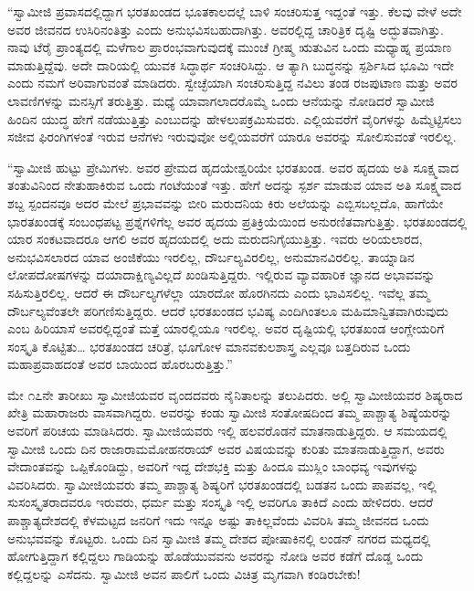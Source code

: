  “ಸ್ವಾಮೀಜಿ ಪ್ರವಾಸದಲ್ಲಿದ್ದಾಗ ಭರತಖಂಡದ ಭೂತಕಾಲದಲ್ಲೆ ಬಾಳಿ ಸಂಚರಿಸುತ್ತ ಇದ್ದಂತೆ ಇತ್ತು. ಕೆಲವು ವೇಳೆ ಅದೇ ಅವರ ಜೀವನದ ಉಸಿರಿನಂತಿತ್ತು ಎಂದು ಅನುಭವಿಸಬಹುದಾಗಿತ್ತು. ಅವರಲ್ಲಿದ್ದ ಚಾರಿತ್ರಿಕ ದೃಷ್ಟಿ ಅದ್ಭುತವಾಗಿತ್ತು. ನಾವು ಟೆರೈ ಪ್ರಾಂತ್ಯದಲ್ಲಿ ಮಳೆಗಾಲ ಪ್ರಾರಂಭವಾಗುವುದಕ್ಕೆ ಮುಂಚೆ ಗ್ರೀಷ್ಮ ಋತುವಿನ ಒಂದು ಮಧ್ಯಾಹ್ನ ಪ್ರಯಾಣ ಮಾಡುತ್ತಿದ್ದೆವು. ಅದೇ ದಾರಿಯಲ್ಲಿ ಯುವಕ ಸಿದ್ಧಾರ್ಥ ಸಂಚರಿಸಿದ್ದು. ಆ ತ್ಯಾಗಿ ಬುದ್ಧನನ್ನು ಸ್ಪರ್ಶಿಸಿದ ಭೂಮಿ ಇದೇ ಎಂದು ನಮಗೆ ಅರಿವಾಗುವಂತೆ ಮಾಡಿದರು. ಸ್ವೇಚ್ಛೆಯಾಗಿ ಸಂಚರಿಸುತ್ತಿದ್ದ ನವಿಲು ತಂಡ ರಜಪುಟಾಣ ಮತ್ತು ಅವರ ಲಾವಣಿಗಳನ್ನು ಮನಸ್ಸಿಗೆ ತರುತ್ತಿತ್ತು. ಮಧ್ಯೆ ಯಾವಾಗಲಾದರೊಮ್ಮೆ ಒಂದು ಆನೆಯನ್ನು ನೋಡಿದರೆ ಸ್ವಾಮೀಜಿ ಹಿಂದಿನ ಯುದ್ಧ ಹೇಗೆ ನಡೆಯುತ್ತಿತ್ತು ಎಂಬುದನ್ನು ಹೇಳಲುಪಕ್ರಮಿಸುವರು. ಎಲ್ಲಿಯವರೆಗೆ ವೈರಿಗಳನ್ನು ಹಿಮ್ಮೆಟ್ಟಿಸಲು ಸಜೀವ ಫಿರಂಗಿಗಳಂತೆ ಇರುವ ಆನೆಗಳು ಇರುವುವೋ ಅಲ್ಲಿಯವರೆಗೆ ಯಾರೂ ಅವರನ್ನು ಸೋಲಿಸುವಂತೆ ಇರಲಿಲ್ಲ. 

 “ಸ್ವಾಮೀಜಿ ಹುಟ್ಟು ಪ್ರೇಮಿಗಳು. ಅವರ ಪ್ರೇಮದ ಹೃದಯೇಶ್ವರಿಯೇ ಭರತಖಂಡ. ಅವರ ಹೃದಯ ಅತಿ ಸೂಕ್ಷ್ಮವಾದ ತಂತುವಿನಿಂದ ನೇತುಹಾಕಿರುವ ಒಂದು ಗಂಟೆಯಂತೆ ಇತ್ತು. ಹೇಗೆ ಅದನ್ನು ಸ್ಪರ್ಶ ಮಾಡುವ ಯಾವ ಅತಿ ಸೂಕ್ಷ್ಮವಾದ ಶಬ್ದ ಸ್ಪಂದನವೂ ಅದರ ಮೇಲೆ ಪ್ರಭಾವವನ್ನು ಬೀರಿ ಮರುದನಿಯ ಕಿರು ಅಲೆಯನ್ನು ಎಬ್ಬಿಸಬಲ್ಲದೊ, ಹಾಗೆಯೇ ಭಾರತಖಂಡಕ್ಕೆ ಸಂಬಂಧಪಟ್ಟ ಪ್ರಶ್ನೆಗಳಿಗೆಲ್ಲ ಅವರ ಹೃದಯ ಪ್ರತಿಕ್ರಿಯೆಯಿಂದ ಅನುರಣಿತವಾಗುತ್ತಿತ್ತು. ಭರತಖಂಡದಲ್ಲಿ ಯಾರ ಸಂಕಟವಾದರೂ ಆಗಲಿ ಅವರ ಹೃದಯದಲ್ಲಿ ಅದು ಮರುದನಿಗೈಯುತ್ತಿತ್ತು. ಇವರು ಅರಿಯಲಾರದ, ಅನುಭವಿಸಲಾರದ ಯಾವ ಅಂಜಿಕೆಯು ಇರಲಿಲ್ಲ, ದೌರ್ಬಲ್ಯವಿರಲಿಲ್ಲ, ಅನುಮಾನವಿರಲಿಲ್ಲ. ತಾಯ್ನಾಡಿನ ಲೋಪದೋಷಗಳನ್ನು ದಯಾದಾಕ್ಷಿಣ್ಯವಿಲ್ಲದೆ ಖಂಡಿಸುತ್ತಿದ್ದರು. ಇಲ್ಲಿರುವ ವ್ಯಾವಹಾರಿಕ ಜ್ಞಾನದ ಅಭಾವವನ್ನು ಸಹಿಸುತ್ತಿರಲಿಲ್ಲ. ಆದರೆ ಈ ದೌರ್ಬಲ್ಯಗಳೆಲ್ಲಾ ಯಾರದೋ ಹೊರಗಿನದು ಎಂದು ಭಾವಿಸಲಿಲ್ಲ. ಇವೆಲ್ಲ ತಮ್ಮ ದೌರ್ಬಲ್ಯವೆಂತಲೇ ಪರಿಗಣಿಸುತ್ತಿದ್ದರು. ಆದರೆ ಭರತಖಂಡದ ಭವಿಷ್ಯ ಎಂದಿಗಿಂತಲೂ ಮಹಿಮಾನ್ವಿತವಾಗಿರುವುದು ಎಂಬ ಹಿರಿಯಾಸೆ ಅವರಲ್ಲಿದ್ದಂತೆ ಮತ್ತೆ ಯಾರಲ್ಲಿಯೂ ಇರಲಿಲ್ಲ. ಅವರ ದೃಷ್ಟಿಯಲ್ಲಿ ಭರತಖಂಡ ಆಂಗ್ಲೇಯರಿಗೆ ಸಂಸ್ಕೃತಿ ಕೊಟ್ಟಿತು… ಭರತಖಂಡದ ಚರಿತ್ರೆ, ಭೂಗೋಳ ಮಾನವಕುಲಶಾಸ್ತ್ರ ಎಲ್ಲವೂ ಬತ್ತದಿರುವ ಒಂದು ಮಹಾಪ್ರವಾಹದಂತೆ ಅವರ ಬಾಯಿಂದ ಹೊರಬರುತ್ತಿತ್ತು.” 

 ಮೇ ೧೭ನೇ ತಾರೀಖು ಸ್ವಾಮೀಜಿಯವರ ವೃಂದದವರು ನೈನಿತಾಲನ್ನು ತಲುಪಿದರು. ಅಲ್ಲಿ ಸ್ವಾಮೀಜಿಯವರ ಶಿಷ್ಯರಾದ ಖೇತ್ರಿ ಮಹಾರಾಜರು ವಾಸವಾಗಿದ್ದರು. ಅವರನ್ನು ಕಂಡು ಸ್ವಾಮೀಜಿ ಸಂತೋಷದಿಂದ ತಮ್ಮ ಪಾಶ್ಚಾತ್ಯ ಶಿಷ್ಯೆಯರನ್ನು ಅವರಿಗೆ ಪರಿಚಯ ಮಾಡಿಸಿದರು. ಸ್ವಾಮೀಜಿಯವರು ಇಲ್ಲಿ ಹಲವರೊಡನೆ ಮಾತನಾಡು\-ತ್ತಿದ್ದರು. ಆ ಸಮಯದಲ್ಲಿ ಸ್ವಾಮೀಜಿ ಒಂದು ದಿನ ರಾಜಾರಾಮಮೋಹನರಾಯ್ ಅವರ ವಿಷಯವನ್ನು ಕುರಿತು ಮಾತನಾಡುತ್ತಿದ್ದಾಗ, ಅವರು ವೇದಾಂತವನ್ನು ಒಪ್ಪಿಕೊಂಡಿದ್ದು, ಅವರಿಗೆ ಇದ್ದ ದೇಶಭಕ್ತಿ ಮತ್ತು ಹಿಂದೂ ಮುಸ್ಲಿಂ ಬಾಂಧವ್ಯ ಇವುಗಳನ್ನು ವಿವರಿಸಿದರು. ಸ್ವಾಮೀಜಿಯವರು ತಮ್ಮ ಪಾಶ್ಚಾತ್ಯ ಶಿಷ್ಯರಿಗೆ ಭರತಖಂಡದಲ್ಲಿ ಬಡತನ ಒಂದು ಪಾಪವಲ್ಲ, ಇಲ್ಲಿ ಸುಸಂಸ್ಕೃತರಾದವರೂ ಇರುವರು, ಧರ್ಮ ಮತ್ತು ಸಂಸ್ಕೃತಿ ಇಲ್ಲಿ ಅವರಿಗೂ ತಾಕಿದೆ ಎಂದು ಹೇಳಿದರು. ಆದರೆ ಪಾಶ್ಚಾತ್ಯದೇಶದಲ್ಲಿ ಕೆಳಮಟ್ಟದ ಜನರಿಗೆ ಇದು ಇನ್ನೂ ಅಷ್ಟು ತಾಕಿಲ್ಲವೆಂದು ವಿವರಿಸಿ ತಮ್ಮ ಜೀವನದ ಒಂದು ಅನುಭವವನ್ನು ಕೊಟ್ಟರು. ಒಂದು ದಿನ ಸ್ವಾಮೀಜಿ ತಮ್ಮ ದೇಶದ ಪೋಷಾಕಿನಲ್ಲಿ ಲಂಡನ್ ನಗರದ ಮಧ್ಯದಲ್ಲಿ ಹೋಗುತ್ತಿದ್ದಾಗ ಕಲ್ಲಿದ್ದಲು ಗಾಡಿಯನ್ನು ಹೊಡೆಯುವವನು ಅವರನ್ನು ನೋಡಿ ಅವರ ಕಡೆಗೆ ದೊಡ್ಡ ಒಂದು ಕಲ್ಲಿದ್ದಲನ್ನು ಎಸೆದನು. ಸ್ವಾಮೀಜಿ ಅವನ ಪಾಲಿಗೆ ಒಂದು ವಿಚಿತ್ರ ಮೃಗವಾಗಿ ಕಂಡಿರಬೇಕು! 

